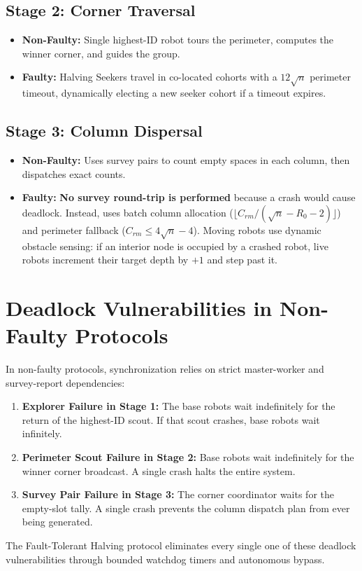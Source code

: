 \documentclass[11pt,a4paper]{report}
\begin{document}
\subsection{Stage 2: Corner Traversal}
\begin{itemize}
    \item \textbf{Non-Faulty:} Single highest-ID robot tours the perimeter, computes the winner corner, and guides the group.
    \item \textbf{Faulty:} Halving Seekers travel in co-located cohorts with a $12\sqrt{n}$ perimeter timeout, dynamically electing a new seeker cohort if a timeout expires.
\end{itemize}

\subsection{Stage 3: Column Dispersal}
\begin{itemize}
    \item \textbf{Non-Faulty:} Uses survey pairs to count empty spaces in each column, then dispatches exact counts.
    \item \textbf{Faulty:} \textbf{No survey round-trip is performed} because a crash would cause deadlock. Instead, uses batch column allocation ($\lfloor C_{rm}/(\sqrt{n}-R_0-2)\rfloor$) and perimeter fallback ($C_{rm} \le 4\sqrt{n}-4$). Moving robots use dynamic obstacle sensing: if an interior node is occupied by a crashed robot, live robots increment their target depth by $+1$ and step past it.
\end{itemize}

\section{Deadlock Vulnerabilities in Non-Faulty Protocols}
In non-faulty protocols, synchronization relies on strict master-worker and survey-report dependencies:
\begin{enumerate}
    \item \textbf{Explorer Failure in Stage 1:} The base robots wait indefinitely for the return of the highest-ID scout. If that scout crashes, base robots wait infinitely.
    \item \textbf{Perimeter Scout Failure in Stage 2:} Base robots wait indefinitely for the winner corner broadcast. A single crash halts the entire system.
    \item \textbf{Survey Pair Failure in Stage 3:} The corner coordinator waits for the empty-slot tally. A single crash prevents the column dispatch plan from ever being generated.
\end{enumerate}
The Fault-Tolerant Halving protocol eliminates every single one of these deadlock vulnerabilities through bounded watchdog timers and autonomous bypass.
\end{document}

